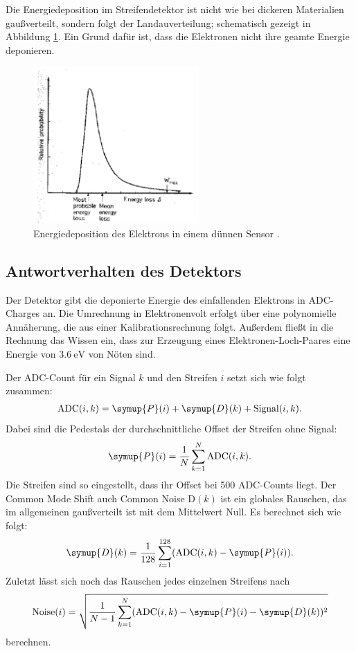 Die Energiedeposition im Streifendetektor ist nicht wie bei dickeren Materialien gaußverteilt, sondern folgt der Landauverteilung; schematisch gezeigt in Abbildung \ref{fig:energiedepositionElektron}. Ein Grund dafür ist, dass die Elektronen nicht ihre geamte Energie deponieren.
\begin{figure}
  \centering
  \includegraphics[height=6cm]{TimosAufrisse/energiedepositionElektron.png}
  \caption{Energiedeposition des Elektrons in einem dünnen Sensor \cite{anleitung}.}
  \label{fig:energiedepositionElektron}
\end{figure}

\subsection{Antwortverhalten des Detektors}

Der Detektor gibt die deponierte Energie des einfallenden Elektrons in ADC-Charges an. Die Umrechnung in Elektronenvolt erfolgt über eine polynomielle Annäherung, die aus einer Kalibrationsrechnung folgt. Außerdem fließt in die Rechnung das Wissen ein, dass zur Erzeugung eines Elektronen-Loch-Paares eine Energie von $\SI{3.6}{\electronvolt}$ von Nöten sind.

Der ADC-Count für ein Signal $k$ und den Streifen $i$ setzt sich wie folgt zusammen:
\begin{align}
  \text{ADC}(i, k) = \symup{P}(i) + \symup{D}(k) + \text{Signal}(i, k).
\end{align}
Dabei sind die Pedestals der durchschnittliche Offset der Streifen ohne Signal:
\begin{align}
  \symup{P}(i) = \frac{1}{N} \sum_{k=1}^N \text{ADC}(i, k).
\end{align}
Die Streifen sind so eingestellt, dass ihr Offset bei \num{500} ADC-Counts liegt.
Der Common Mode Shift auch Common Noise D$(k)$ ist ein globales Rauschen, das im allgemeinen gaußverteilt ist mit dem Mittelwert Null. Es berechnet sich wie folgt:
\begin{align}
  \symup{D}(k) = \frac{1}{128} \sum_{i=1}^{128} (\text{ADC}(i, k) - \symup{P}(i)).
\end{align}
Zuletzt lässt sich noch das Rauschen jedes einzelnen Streifens nach
\begin{align}
  \text{Noise}(i) = \sqrt{\frac{1}{N-1} \sum_{k=1}^N(\text{ADC}(i, k) - \symup{P}(i) - \symup{D}(k))^2}
\end{align}
berechnen.

